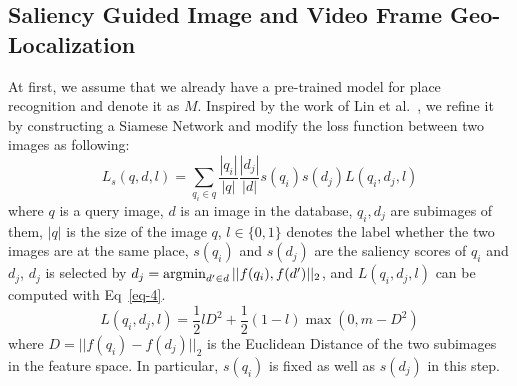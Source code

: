 \subsection{Saliency Guided Image and Video Frame Geo-Localization}
\par
At first, we assume that we already have a pre-trained model for place recognition and denote it as $M$. Inspired by the work of Lin et al.~\cite{lin2015learning}, we refine it by constructing a Siamese Network and modify the loss function between two images as following:
\begin{equation}
\label{eq-3}
L_s(q,d,l) = \sum_{q_i\in q} \frac{|q_i|}{|q|}  \frac{|d_j|}{|d|} s(q_i)s(d_j)L(q_i, d_j, l)
\end{equation}
where $q$ is a query image, $d$ is an image in the database, $q_i, d_j$ are subimages of them, $|q|$ is the size of the image $q$, $l\in \{0,1\}$ denotes the label whether the two images are at the same place, $s(q_i)$ and $s(d_j)$ are the saliency scores of $q_i$ and $d_j$, $d_j$ is selected by $d_j = \operatorname*{argmin}_{{d'} \in d} ||f(q_i), f({d'})||_2 $, and $L(q_i, d_j, l)$ can be computed with Eq~\eqref{eq-4}.
\begin{equation}
\label{eq-4}
L(q_i, d_j, l)=\frac{1}{2}lD^2 + \frac{1}{2}(1-l)\max(0,m-D^2)
\end{equation}
where $D = ||f(q_i) - f(d_j)||_2$ is the Euclidean Distance of the two subimages in the feature space. In particular, $s(q_i)$ is fixed as well as $s(d_j)$ in this step. 

